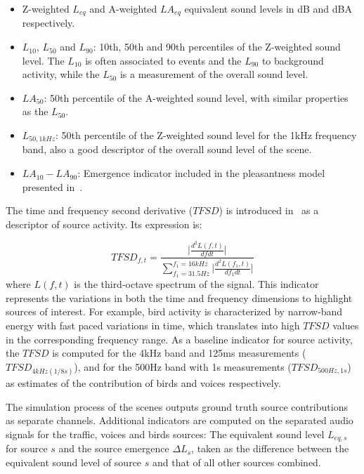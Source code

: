 \documentclass[twocolumn]{article}
\begin{document}
\begin{itemize}
\item Z-weighted $L_{eq}$ and A-weighted $LA_{eq}$ equivalent sound levels in dB and dBA respectively.
\item $L_{10}$, $L_{50}$ and $L_{90}$: 10th, 50th and 90th percentiles of the Z-weighted sound level. The $L_{10}$ is often associated to events and the $L_{90}$ to background activity, while the $L_{50}$ is a measurement of the overall sound level.
\item $LA_{50}$: 50th percentile of the A-weighted sound level, with similar properties as the $L_{50}$.
\item $L_{50, 1kHz}$: 50th percentile of the Z-weighted sound level for the 1kHz frequency band, also a good descriptor of the overall sound level of the scene.
\item $LA_{10}-LA_{90}$: Emergence indicator included in the pleasantness model presented in~\cite{ricciardi2014}.
\end{itemize}

The time and frequency second derivative ($TFSD$) is introduced in~\cite{aumond2017} as a descriptor of source activity. Its expression is:

\begin{equation}
TFSD_{f, t} = \frac{\lvert\frac{d^2L(f, t)}{dfdt}\rvert}{\sum_{f_1=31.5Hz}^{f_1=16kHz}\lvert\frac{d^2L(f_1, t)}{df_1dt}\rvert}
\end{equation}
where $L(f, t)$ is the third-octave spectrum of the signal. This indicator represents the variations in both the time and frequency dimensions to highlight sources of interest. For example, bird activity is characterized by narrow-band energy with fast paced variations in time, which translates into high $TFSD$ values in the corresponding frequency range. As a baseline indicator for source activity, the $TFSD$ is computed for the 4kHz band and 125ms measurements ($TFSD_{4kHz(1/8s)}$), and for the 500Hz band with 1s measurements ($TFSD_{500Hz, 1s}$) as estimates of the contribution of birds and voices respectively.

The simulation process of the scenes outputs ground truth source contributions as separate channels. Additional indicators are computed on the separated audio signals for the traffic, voices and birds sources: The equivalent sound level $L_{eq, s}$ for source $s$ and the source emergence $\Delta L_{s}$, taken as the difference between the equivalent sound level of source $s$ and that of all other sources combined.
\end{document}
